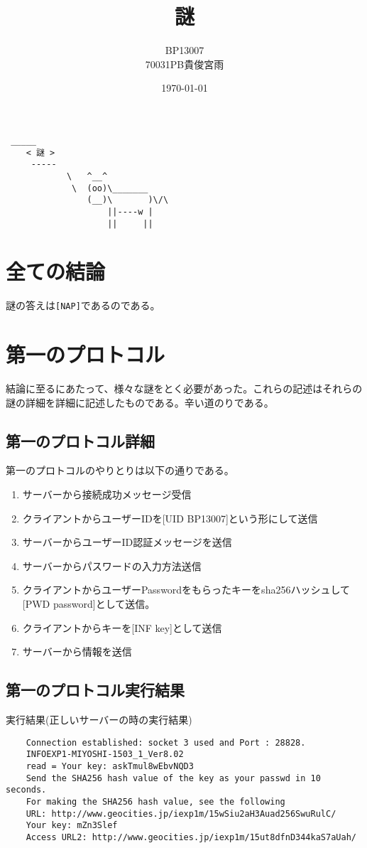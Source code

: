 \documentclass[a4paper,12pt]{jarticle}
\title{謎}
\author{BP13007\\ 70031PB貴俊宮雨}
\date{\today}
\begin{document}
\begin{titlepage}
 \maketitle
 \begin{center}
  
\begin{verbatim}
 _____
	< 謎 >
	 -----
	        \   ^__^
	         \  (oo)\_______
	            (__)\       )\/\
	                ||----w |
	                ||     ||	
\end{verbatim}
  \end{center}
\end{titlepage}
\section{全ての結論}
謎の答えは\verb+[NAP]+であるのである。
\section{第一のプロトコル}
結論に至るにあたって、様々な謎をとく必要があった。これらの記述はそれらの謎の詳細を詳細に記述したものである。辛い道のりである。
\subsection{第一のプロトコル詳細}
第一のプロトコルのやりとりは以下の通りである。
\begin{enumerate}
 \item サーバーから接続成功メッセージ受信
 \item クライアントからユーザーIDを[UID BP13007]という形にして送信
 \item サーバーからユーザーID認証メッセージを送信
 \item サーバーからパスワードの入力方法送信
 \item クライアントからユーザーPasswordをもらったキーをsha256ハッシュして[PWD password]として送信。
 \item クライアントからキーを[INF key]として送信
 \item サーバーから情報を送信      
\end{enumerate}
\subsection{第一のプロトコル実行結果}
\begin{itembox}{実行結果(正しいサーバーの時の実行結果)}
\begin{verbatim}
	Connection established: socket 3 used and Port : 28828.
	INFOEXP1-MIYOSHI-1503_1_Ver8.02
	read = Your key: askTmul8wEbvNQD3
	Send the SHA256 hash value of the key as your passwd in 10 seconds.
	For making the SHA256 hash value, see the following
	URL: http://www.geocities.jp/iexp1m/15wSiu2aH3Auad256SwuRulC/
	Your key: mZn3Slef
	Access URL2: http://www.geocities.jp/iexp1m/15ut8dfnD344kaS7aUah/	
\end{verbatim}
\end{itembox}
\end{document}
